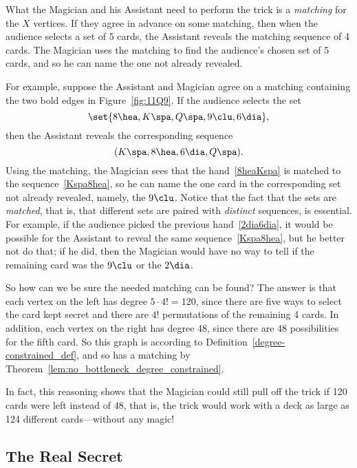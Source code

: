 What the Magician and his Assistant need to perform the trick is a
\emph{matching} for the $X$ vertices.  If they agree in advance on
some matching, then when the audience selects a set of 5 cards, the
Assistant reveals the matching sequence of 4 cards.  The Magician uses
the matching to find the audience's chosen set of 5 cards, and so he
can name the one not already revealed.

For example, suppose the Assistant and Magician agree on a matching
containing the two bold edges in Figure~\ref{fig:11Q9}.  If the
audience selects the set
\begin{equation}\label{8heaKspa}
\set{8 \hea, K \spa, Q \spa, 9 \clu, 6 \dia},
\end{equation}
then the Assistant reveals the corresponding sequence
\begin{equation}\label{Kspa8hea}
(K \spa, 8 \hea, 6 \dia, Q \spa).
\end{equation}
Using the matching, the Magician sees that the hand~\eqref{8heaKspa}
is matched to the sequence~\eqref{Kspa8hea}, so he can name the one
card in the corresponding set not already revealed, namely, the $9
\clu$.  Notice that the fact that the sets are \emph{matched}, that
is, that different sets are paired with \emph{distinct} sequences, is
essential.  For example, if the audience picked the previous
hand~\eqref{2dia6dia}, it would be possible for the Assistant to
reveal the same sequence~\eqref{Kspa8hea}, but he better not do that;
if he did, then the Magician would have no way to tell if the
remaining card was the $9 \clu$ or the $2 \dia$.

So how can we be sure the needed matching can be found?  The answer is
that each vertex on the left has degree $5 \cdot 4! = 120$, since
there are five ways to select the card kept secret and there are $4!$
permutations of the remaining 4 cards.  In addition, each vertex on
the right has degree 48, since there are 48 possibilities for the
fifth card.  So this graph is \emph{}
according to Definition~\ref{degree-constrained_def}, and so
has a matching by Theorem~\ref{lem:no_bottleneck_degree_constrained}.

In fact, this reasoning shows that the Magician could still pull off
the trick if 120 cards were left instead of 48, that is, the trick
would work with a deck as large as 124 different cards---without any
magic!

\subsection{The Real Secret}

